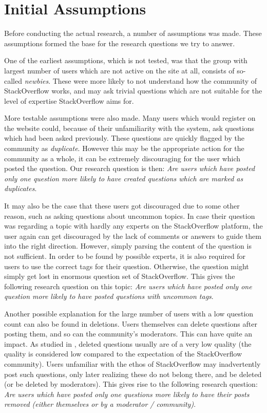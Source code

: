 \documentclass[conference]{IEEEtran}
\begin{document}
\section{Initial Assumptions} \label{InitialAssumptions}

Before conducting the actual research, a number of assumptions was made. These assumptions formed the base for the research questions we try to answer.

One of the earliest assumptions, which is not tested, was that the group with largest number of users which are not active on the site at all, consists of so-called \textit{newbies}. These were more likely to not understand how the community of StackOverflow works, and may ask trivial questions which are not suitable for the level of expertise StackOverflow aims for.

More testable assumptions were also made. Many users which would register on the website could, because of their unfamiliarity with the system, ask questions which had been asked previously. These questions are quickly flagged by the community as \textit{duplicate}. However this may be the appropriate action for the community as a whole, it can be extremely discouraging for the user which posted the question. Our research question is then: \textit{Are users which have posted only one question more likely to have created questions which are marked as duplicates}.

It may also be the case that these users got discouraged due to some other reason, such as asking questions about uncommon topics. In case their question was regarding a topic with hardly any experts on the StackOverflow platform, the user again can get discouraged by the lack of comments or answers to guide them into the right direction. However, simply parsing the content of the question is not sufficient. In order to be found by possible experts, it is also required for users to use the correct tags for their question. Otherwise, the question might simply get lost in enormous question set of StackOverflow. This gives the following research question on this topic: \textit{Are users which have posted only one question more likely to have posted questions with uncommon tags}.

Another possible explanation for the large number of users with a low question count can also be found in deletions. Users themselves can delete questions after posting them, and so can the community's moderators. This can have quite an impact. As studied in \cite{correa2014chaff}, deleted questions usually are of a very low quality (the quality is considered low compared to the expectation of the StackOverflow community). Users unfamiliar with the ethos of StackOverflow may inadvertently post such questions, only later realizing these do not belong there, and be deleted (or be deleted by moderators). This gives rise to the following research question: \textit{Are users which have posted only one questions more likely to have their posts removed (either themselves or by a moderator / community)}.
\end{document}
